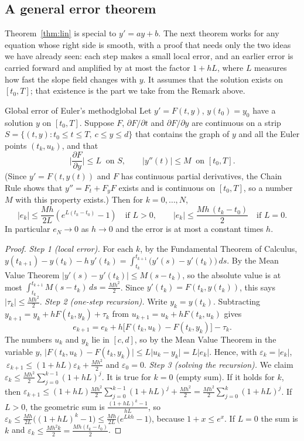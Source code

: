 \documentclass[11pt]{article}
\begin{document}
\subsection*{A general error theorem}

Theorem~\ref{thm:lin} is special to $y'=ay+b$. The next theorem works for any equation whose right side is smooth, with a proof that needs only the two ideas we have already seen: each step makes a small local error, and an earlier error is carried forward and amplified by at most the factor $1+hL$, where $L$ measures how fast the slope field changes with $y$. It assumes that the solution exists on $[t_0,T]$; that existence is the part we take from the Remark above.

\begin{thm}{Global error of Euler's method}{global}
Let $y'=F(t,y)$, $y(t_0)=y_0$ have a solution $y$ on $[t_0,T]$. Suppose $F$, $\partial F/\partial t$ and $\partial F/\partial y$ are continuous on a strip $S=\{(t,y):t_0\le t\le T,\ c\le y\le d\}$ that contains the graph of $y$ and all the Euler points $(t_k,u_k)$, and that
\[
\Big\lvert\frac{\partial F}{\partial y}\Big\rvert\le L\ \text{ on }S,\qquad\lvert y''(t)\rvert\le M\ \text{ on }[t_0,T].
\]
(Since $y'=F(t,y(t))$ and $F$ has continuous partial derivatives, the Chain Rule shows that $y''=F_t+F_yF$ exists and is continuous on $[t_0,T]$, so a number $M$ with this property exists.) Then for $k=0,\dots,N$,
\[
\lvert e_k\rvert\le\frac{Mh}{2L}\left(e^{L(t_k-t_0)}-1\right)\quad\text{if }L>0,\qquad\lvert e_k\rvert\le\frac{Mh\,(t_k-t_0)}2\quad\text{if }L=0.
\]
In particular $e_N\to0$ as $h\to0$ and the error is at most a constant times $h$.
\end{thm}
\begin{proof}
\emph{Step 1 (local error).} For each $k$, by the Fundamental Theorem of Calculus,
$y(t_{k+1})-y(t_k)-h\,y'(t_k)=\int_{t_k}^{t_{k+1}}\big(y'(s)-y'(t_k)\big)\,ds$. By the Mean Value Theorem $\lvert y'(s)-y'(t_k)\rvert\le M(s-t_k)$, so the absolute value is at most $\int_{t_k}^{t_{k+1}}M(s-t_k)\,ds=\frac{Mh^2}2$. Since $y'(t_k)=F(t_k,y(t_k))$, this says $\lvert\tau_k\rvert\le\frac{Mh^2}2$.
\emph{Step 2 (one-step recursion).} Write $y_k=y(t_k)$. Subtracting $y_{k+1}=y_k+hF(t_k,y_k)+\tau_k$ from $u_{k+1}=u_k+hF(t_k,u_k)$ gives
\[
e_{k+1}=e_k+h\big[F(t_k,u_k)-F(t_k,y_k)\big]-\tau_k .
\]
The numbers $u_k$ and $y_k$ lie in $[c,d]$, so by the Mean Value Theorem in the variable $y$, $\lvert F(t_k,u_k)-F(t_k,y_k)\rvert\le L\lvert u_k-y_k\rvert=L\lvert e_k\rvert$. Hence, with $\varepsilon_k=\lvert e_k\rvert$, $\ \varepsilon_{k+1}\le(1+hL)\varepsilon_k+\frac{Mh^2}2$ and $\varepsilon_0=0$.
\emph{Step 3 (solving the recursion).} We claim $\varepsilon_k\le\frac{Mh^2}2\sum_{j=0}^{k-1}(1+hL)^j$. It is true for $k=0$ (empty sum). If it holds for $k$, then $\varepsilon_{k+1}\le(1+hL)\frac{Mh^2}2\sum_{j=0}^{k-1}(1+hL)^j+\frac{Mh^2}2=\frac{Mh^2}2\sum_{j=0}^{k}(1+hL)^j$. If $L>0$, the geometric sum is $\frac{(1+hL)^k-1}{hL}$, so $\varepsilon_k\le\frac{Mh}{2L}\big((1+hL)^k-1\big)\le\frac{Mh}{2L}\big(e^{Lkh}-1\big)$, because $1+x\le e^x$. If $L=0$ the sum is $k$ and $\varepsilon_k\le\frac{Mh^2k}2=\frac{Mh(t_k-t_0)}2$.
\end{proof}
\end{document}
